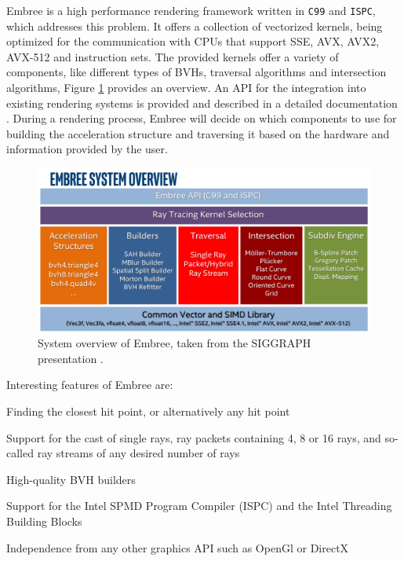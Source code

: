 Embree is a high performance rendering framework written in \texttt{C99} and \texttt{ISPC}, which addresses this problem. It offers a collection of vectorized kernels, being optimized for the communication with CPUs that support SSE, AVX, AVX2, AVX-512 and instruction sets. The provided kernels offer a variety of components, like different types of BVHs, traversal algorithms and intersection algorithms, Figure \ref{fig:embree} provides an overview. 
An API for the integration into existing rendering systems is provided and described in a detailed documentation \cite{embree2021Doc}. 
During a rendering process, Embree will decide on which components to use for building the acceleration structure and traversing it based on the hardware and information provided by the user.

\begin{figure}
	\centering
	\includegraphics[width=1\linewidth]{img/1 fundamentals/embree_overview.png}
	\caption{System overview of Embree, taken from the SIGGRAPH presentation  \cite{embreeSlides}.}
	\label{fig:embree}
\end{figure}

Interesting features of Embree are:
\begin{description}
	\setlength\itemsep{0.05em}
	\item 	Finding the closest hit point, or alternatively any hit point
	\item 	Support for the cast of single rays, ray packets containing 4, 8 or 16 rays, and so-called ray streams of any desired number of rays
	\item 	High-quality BVH builders
	\item 	Support for the Intel SPMD Program Compiler (ISPC) and the Intel Threading Building Blocks
	\item 	Independence from any other graphics API such as OpenGl or DirectX
\end{description}

